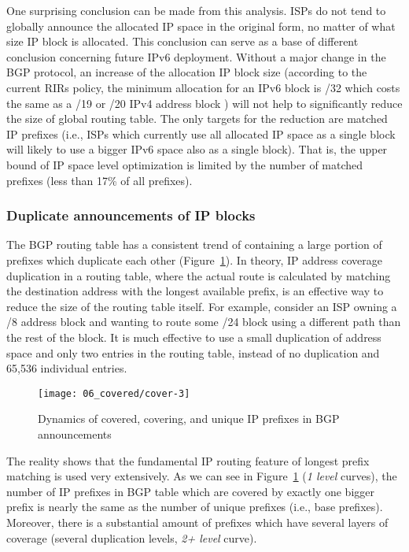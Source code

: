 One surprising conclusion can be made from this analysis. ISPs do not tend to
globally announce the allocated IP space in the original form, no matter of
what size IP block is allocated. This conclusion can serve as a base of
different conclusion concerning future IPv6 deployment. Without a major change
in the BGP protocol, an increase of the allocation IP block size (according to
the current RIRs policy, the minimum allocation for an IPv6 block is
/32\cite{APNIC:2009:IPv6-Address} which costs the same as a /19 or /20 IPv4
address block \cite{ARIN:2009:Annual-Fee-Scedule}) will not help to
significantly reduce the size of global routing table. The only targets for
the reduction are matched IP prefixes (i.e., ISPs which currently use all
allocated IP space as a single block will likely to use a bigger IPv6 space
also as a single block). That is, the upper bound of IP space level
optimization is limited by the number of matched prefixes (less than 17\% of
all prefixes).

\subsubsection{Duplicate announcements of IP blocks}

The BGP routing table has a consistent trend of containing a large portion of
prefixes which duplicate each other (Figure~\ref{fig:covered}). In theory, IP
address coverage duplication in a routing table, where the actual route is
calculated by matching the destination address with the longest available
prefix, is an effective way to reduce the size of the routing table itself.
For example, consider an ISP owning a /8 address block and wanting to route
some /24 block using a different path than the rest of the block. It is much
effective to use a small duplication of address space and only two entries in
the routing table, instead of no duplication and 65,536 individual entries.

\begin{figure}[htbp]
	\centering
		\texttt{[image: 06\_covered/cover-3]}
	\caption{Dynamics of covered, covering, and unique IP prefixes in BGP announcements}
	\label{fig:covered}
\end{figure}

The reality shows that the fundamental IP routing feature of longest prefix
matching is used very extensively. As we can see in Figure~\ref{fig:covered}
(\emph{1 level} curves), the number of IP prefixes in BGP table which are
covered by exactly one bigger prefix is nearly the same as the number of
unique prefixes (i.e., base prefixes). Moreover, there is a substantial amount
of prefixes which have several layers of coverage (several duplication levels,
\emph{2+ level} curve).

